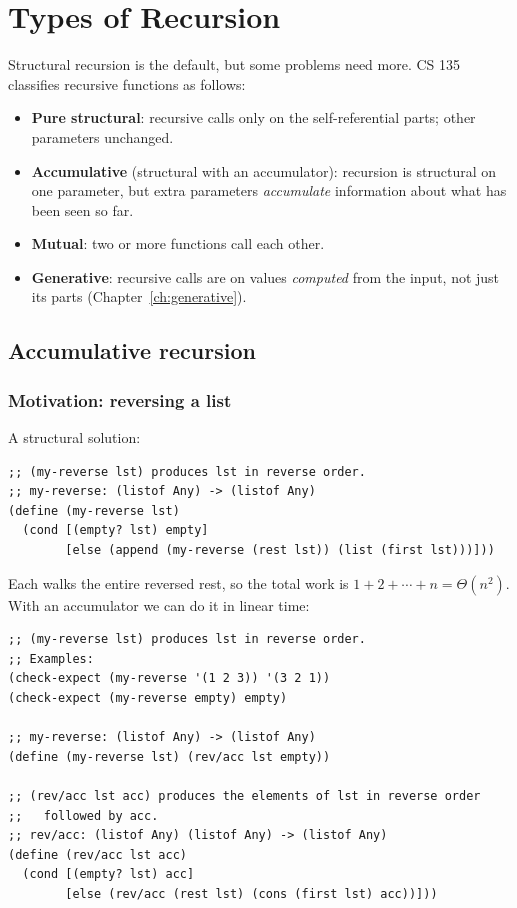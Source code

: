 \chapter{Types of Recursion}

Structural recursion is the default, but some problems need more. CS 135
classifies recursive functions as follows:

\begin{itemize}
  \item \textbf{Pure structural}: recursive calls only on the self-referential parts; other parameters unchanged.
  \item \textbf{Accumulative} (structural with an accumulator): recursion is structural on one parameter, but extra parameters \emph{accumulate} information about what has been seen so far.
  \item \textbf{Mutual}: two or more functions call each other.
  \item \textbf{Generative}: recursive calls are on values \emph{computed} from the input, not just its parts (Chapter~\ref{ch:generative}).
\end{itemize}

\section{Accumulative recursion}

\subsection{Motivation: reversing a list}
A structural solution:
\begin{lstlisting}[style=racket]
;; (my-reverse lst) produces lst in reverse order.
;; my-reverse: (listof Any) -> (listof Any)
(define (my-reverse lst)
  (cond [(empty? lst) empty]
        [else (append (my-reverse (rest lst)) (list (first lst)))]))
\end{lstlisting}
Each  walks the entire reversed rest, so the total work is
$1 + 2 + \cdots + n = \Theta(n^2)$. With an accumulator we can do it in linear
time:

\begin{lstlisting}[style=racket]
;; (my-reverse lst) produces lst in reverse order.
;; Examples:
(check-expect (my-reverse '(1 2 3)) '(3 2 1))
(check-expect (my-reverse empty) empty)

;; my-reverse: (listof Any) -> (listof Any)
(define (my-reverse lst) (rev/acc lst empty))

;; (rev/acc lst acc) produces the elements of lst in reverse order
;;   followed by acc.
;; rev/acc: (listof Any) (listof Any) -> (listof Any)
(define (rev/acc lst acc)
  (cond [(empty? lst) acc]
        [else (rev/acc (rest lst) (cons (first lst) acc))]))
\end{lstlisting}

